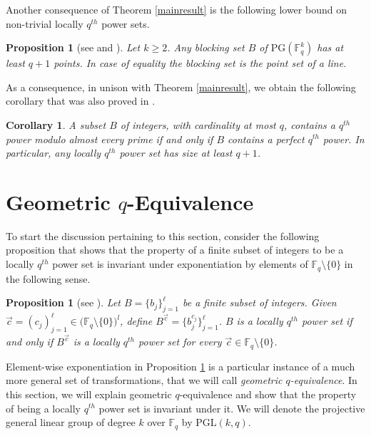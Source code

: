 \documentclass[12pt]{amsart}
\newtheorem{corollary}[theorem]{Corollary}
\newtheorem{proposition}[theorem]{Proposition}
\newcommand{\F}{{\mathbb F}}
\newcommand{\PG}{\mathrm{PG}}
\begin{document}
Another consequence of Theorem \ref{mainresult} is the following lower bound on non-trivial locally $q^{th}$ power sets. 

\begin{proposition} [see \textnormal{\cite[Theorem 2.1]{blokhuis2011blocking} and \cite{bose1966characterization}}] 
Let $k \geq 2$. Any blocking set $B$ of $\PG(\F_{q}^{k})$ has at least $q+1$ points. In case of equality the blocking set is the point set of a line. \label{th:firstboundblocking}
\end{proposition}

As a consequence, in unison with Theorem \ref{mainresult}, we obtain the following corollary that was also proved in \cite{mishra2023prime}. 

\begin{corollary} \label{prop:leqq}
A subset $B$ of integers, with cardinality at most $q$, contains a $q^{th}$ power modulo almost every prime if and only if $B$ contains a perfect $q^{th}$ power. In particular, any locally $q^{th}$ power set has size at least $q+1$.
\end{corollary}

\section{Geometric $q$-Equivalence} \label{section:geomeq}
To start the discussion pertaining to this section, consider the following proposition that shows that the property of a finite subset of integers to be a locally $q^{th}$ power set is invariant under exponentiation by elements of $\F_{q}\setminus\{0\}$ in the following sense. 
\begin{proposition} [see \textnormal{\cite[Corollary 2]{mishra2023prime}}]
Let $B = \{b_{j}\}_{j=1}^{\ell}$ be a finite subset of integers. Given $\Vec{c}=(c_{j})_{j=1}^{\ell} \in\Big(\F_{q}\setminus\{0\}\Big)^{l}$, define $B^{\Vec{c}} = \{b_{j}^{c_{j}}\}_{j=1}^{\ell}$. $B$ is a locally $q^{th}$ power set if and only if $B^{\Vec{c}}$ is a locally $q^{th}$ power set for every $\Vec{c}\in\F_{q}\setminus\{0\}$. \label{exponentiation} 
\end{proposition}

Element-wise exponentiation in Proposition \ref{exponentiation} is a particular instance of a much more general set of transformations, that we will call \textit{geometric $q$-equivalence}. In this section, we will explain geometric $q$-equivalence and show that the property of being a locally $q^{th}$ power set is invariant under it. We will denote the projective general linear group of degree $k$ over $\F_{q}$ by $\mathrm{PGL}(k,q)$.
\end{document}
